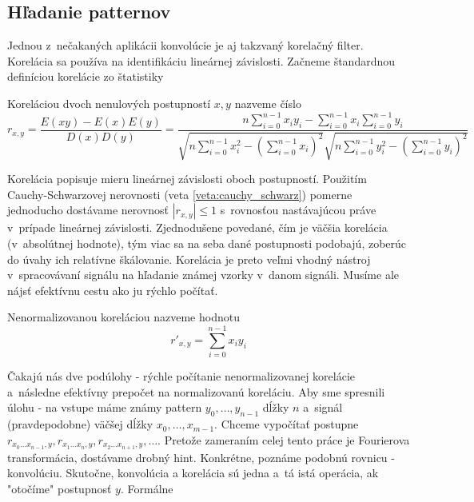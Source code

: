 \subsection{Hľadanie patternov}
Jednou z~nečakaných aplikácii konvolúcie je aj takzvaný korelačný
filter. Korelácia sa používa na identifikáciu lineárnej závislosti.
Začneme štandardnou definíciou korelácie zo štatistiky
\begin{definicia}[Korelácia]
  Koreláciou dvoch nenulových postupností $x,y$ nazveme číslo
  \begin{equation*}
    r_{x,y} = \frac{E(xy)-E(x)E(y)}{D(x)D(y)} =
        \frac{\displaystyle
            n \sum_{i=0}^{n-1} x_i y_i - \sum_{i=0}^{n-1} x_i
            \sum_{i=0}^{n-1} y_i}{\displaystyle
        \sqrt{n \sum_{i=0}^{n-1} x_i^2 - 
            \left(\sum_{i=0}^{n-1}x_i\right)^2}
        \sqrt{n \sum_{i=0}^{n-1} y_i^2 - 
            \left(\sum_{i=0}^{n-1} y_i\right)^2}}
  \end{equation*}
\end{definicia}
Korelácia popisuje mieru lineárnej závislosti oboch postupností.
Použitím Cauchy-Schwarzovej nerovnosti (veta
\ref{veta:cauchy_schwarz}) pomerne jednoducho dostávame
nerovnosť $|r_{x,y}| \le 1$ s~rovnosťou nastávajúcou práve v~prípade
lineárnej závislosti. Zjednodušene povedané, čím je väčšia korelácia
(v~absolútnej hodnote), tým viac sa na seba dané postupnosti podobajú,
zoberúc do úvahy ich relatívne škálovanie. Korelácia je preto veľmi
vhodný nástroj v~spracovávaní signálu na hľadanie známej vzorky 
v~danom signáli. Musíme ale nájsť efektívnu cestu ako ju rýchlo počítať.
\begin{definicia}
    Nenormalizovanou koreláciou nazveme hodnotu
    \begin{equation*}
        r'_{x,y} = \sum_{i=0}^{n-1} x_i y_i
    \end{equation*}
\end{definicia}
Čakajú nás dve podúlohy - rýchle počítanie nenormalizovanej korelácie 
a~následne efektívny prepočet na normalizovanú koreláciu.
Aby sme spresnili úlohu - na vstupe máme známy pattern $y_0,\dots,y_{n-1}$
dĺžky $n$ a~signál (pravdepodobne) väčšej dĺžky $x_0,\dots, x_{m-1}$.
Chceme vypočítať postupne
$r_{x_0\dots x_{n-1},y}, r_{x_1\dots x_n,y}, r_{x_2\dots x_{n+1},y},\dots$.
Pretože zameraním celej tento práce je Fourierova transformácia,
dostávame drobný hint. Konkrétne, poznáme podobnú rovnicu - konvolúciu.
Skutočne, konvolúcia a korelácia sú jedna a~tá istá operácia, ak
"otočíme" postupnosť $y$.
Formálne
